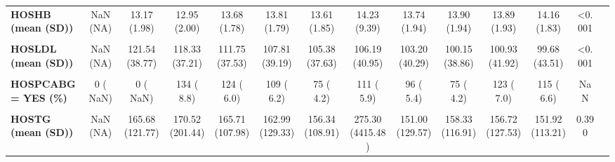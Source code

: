 \documentclass[
]{article}
\begin{document}
\begin{table}[H]
\begin{tabular}[t]{>{\raggedright\arraybackslash}p{5em}ccccccccccccc}
\textbf{HOSHB (mean (SD))} & NaN (NA) & 13.17 (1.98) & 12.95 (2.00) & 13.68 (1.78) & 13.81 (1.79) & 13.61 (1.85) & 14.23 (9.39) & 13.74 (1.94) & 13.90 (1.94) & 13.89 (1.93) & 14.16 (1.83) & <0.001 & \\
\textbf{\cellcolor{gray!10}{HOSHDL (mean (SD))}} & \cellcolor{gray!10}{NaN (NA)} & \cellcolor{gray!10}{42.46 (12.42)} & \cellcolor{gray!10}{42.01 (14.74)} & \cellcolor{gray!10}{40.95 (11.08)} & \cellcolor{gray!10}{39.95 (13.75)} & \cellcolor{gray!10}{40.18 (11.95)} & \cellcolor{gray!10}{38.73 (12.03)} & \cellcolor{gray!10}{39.93 (14.08)} & \cellcolor{gray!10}{71.29 (1162.44)} & \cellcolor{gray!10}{40.67 (12.70)} & \cellcolor{gray!10}{40.63 (12.59)} & \cellcolor{gray!10}{0.462} & \cellcolor{gray!10}{}\\
\textbf{HOSLDL (mean (SD))} & NaN (NA) & 121.54 (38.77) & 118.33 (37.21) & 111.75 (37.53) & 107.81 (39.19) & 105.38 (37.63) & 106.19 (40.95) & 103.20 (40.29) & 100.15 (38.86) & 100.93 (41.92) & 99.68 (43.51) & <0.001 & \\
\textbf{\cellcolor{gray!10}{HOSMB = YES (\%)}} & \cellcolor{gray!10}{951 ( 76.2)} & \cellcolor{gray!10}{653 ( 80.0)} & \cellcolor{gray!10}{405 ( 73.6)} & \cellcolor{gray!10}{128 ( 76.2)} & \cellcolor{gray!10}{217 ( 74.1)} & \cellcolor{gray!10}{236 ( 67.0)} & \cellcolor{gray!10}{0 (  NaN)} & \cellcolor{gray!10}{0 (  NaN)} & \cellcolor{gray!10}{0 (  NaN)} & \cellcolor{gray!10}{0 (  NaN)} & \cellcolor{gray!10}{0 (  NaN)} & \cellcolor{gray!10}{NaN} & \cellcolor{gray!10}{}\\
\textbf{HOSPCABG = YES (\%)} & 0 (  NaN) & 0 (  NaN) & 134 (  8.8) & 124 (  6.0) & 109 (  6.2) & 75 (  4.2) & 111 (  5.9) & 96 (  5.4) & 75 (  4.2) & 123 (  7.0) & 115 (  6.6) & NaN & \\
\textbf{\cellcolor{gray!10}{HOSPCK (mean (SD))}} & \cellcolor{gray!10}{1054.21 (1487.79)} & \cellcolor{gray!10}{1034.74 (2270.18)} & \cellcolor{gray!10}{951.39 (1615.82)} & \cellcolor{gray!10}{986.92 (2325.88)} & \cellcolor{gray!10}{809.56 (1240.17)} & \cellcolor{gray!10}{467.54 (492.93)} & \cellcolor{gray!10}{820.66 (1465.45)} & \cellcolor{gray!10}{837.34 (1519.56)} & \cellcolor{gray!10}{953.13 (2774.97)} & \cellcolor{gray!10}{815.08 (1346.61)} & \cellcolor{gray!10}{844.84 (1598.10)} & \cellcolor{gray!10}{<0.001} & \cellcolor{gray!10}{}\\
\textbf{HOSTG (mean (SD))} & NaN (NA) & 165.68 (121.77) & 170.52 (201.44) & 165.71 (107.98) & 162.99 (129.33) & 156.34 (108.91) & 275.30 (4415.48) & 151.00 (129.57) & 158.33 (116.91) & 156.72 (127.53) & 151.92 (113.21) & 0.390 & \\

\end{tabular}
\end{table}
\end{document}
